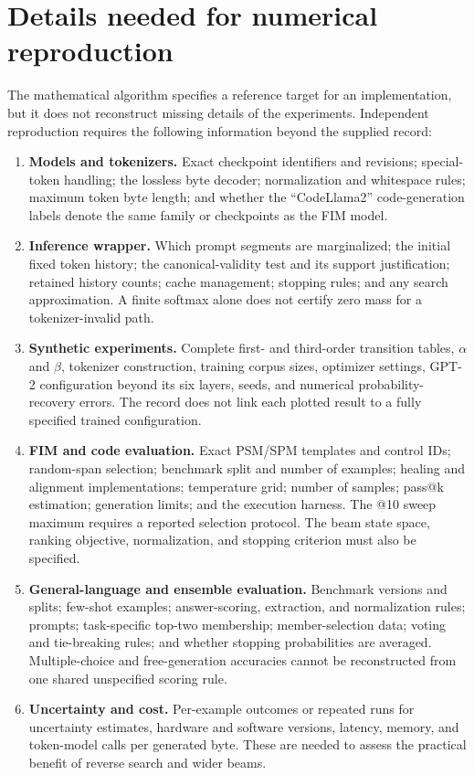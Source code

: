 \documentclass{article}
\begin{document}
\section{Details needed for numerical reproduction}
\label{app:reproducibility}
The mathematical algorithm specifies a reference target for an implementation, but it does not reconstruct missing details of the experiments. Independent reproduction requires the following information beyond the supplied record:
\begin{enumerate}
\item \textbf{Models and tokenizers.} Exact checkpoint identifiers and revisions; special-token handling; the lossless byte decoder; normalization and whitespace rules; maximum token byte length; and whether the ``CodeLlama2'' code-generation labels denote the same family or checkpoints as the FIM model.
\item \textbf{Inference wrapper.} Which prompt segments are marginalized; the initial fixed token history; the canonical-validity test and its support justification; retained history counts; cache management; stopping rules; and any search approximation. A finite softmax alone does not certify zero mass for a tokenizer-invalid path.
\item \textbf{Synthetic experiments.} Complete first- and third-order transition tables, $\alpha$ and $\beta$, tokenizer construction, training corpus sizes, optimizer settings, GPT-2 configuration beyond its six layers, seeds, and numerical probability-recovery errors. The record does not link each plotted result to a fully specified trained configuration.
\item \textbf{FIM and code evaluation.} Exact PSM/SPM templates and control IDs; random-span selection; benchmark split and number of examples; healing and alignment implementations; temperature grid; number of samples; pass@k estimation; generation limits; and the execution harness. The @10 sweep maximum requires a reported selection protocol. The beam state space, ranking objective, normalization, and stopping criterion must also be specified.
\item \textbf{General-language and ensemble evaluation.} Benchmark versions and splits; few-shot examples; answer-scoring, extraction, and normalization rules; prompts; task-specific top-two membership; member-selection data; voting and tie-breaking rules; and whether stopping probabilities are averaged. Multiple-choice and free-generation accuracies cannot be reconstructed from one shared unspecified scoring rule.
\item \textbf{Uncertainty and cost.} Per-example outcomes or repeated runs for uncertainty estimates, hardware and software versions, latency, memory, and token-model calls per generated byte. These are needed to assess the practical benefit of reverse search and wider beams.
\end{enumerate}
\end{document}
